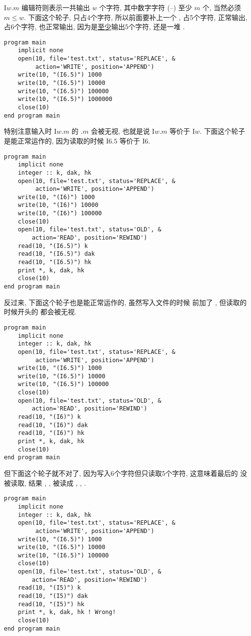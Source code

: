I$ w. m $ 编辑符则表示一共输出 $ w $ 个字符, 其中数字字符 (--) 至少 $ m $ 个, 当然必须 $ m\leqslant  w $. 下面这个轮子,  只占4个字符, 所以前面要补上一个 ,  占5个字符, 正常输出,  占6个字符, 也正常输出, 因为是\uline{至少}输出5个字符,  还是一堆 \ttt{*}. 
\begin{lstlisting}
program main
    implicit none
    open(10, file='test.txt', status='REPLACE', &
         action='WRITE', position='APPEND')
    write(10, "(I6.5)") 1000
    write(10, "(I6.5)") 10000
    write(10, "(I6.5)") 100000
    write(10, "(I6.5)") 1000000
    close(10)
end program main
\end{lstlisting}
特别注意输入时 I$w.m $ 的 $. m $ 会被无视, 也就是说 I$w. m $ 等价于 I$w $. 下面这个轮子是能正常运作的, 因为读取的时候 I$ 6.5 $ 等价于 I$6 $. 
\begin{lstlisting}
program main
    implicit none
    integer :: k, dak, hk
    open(10, file='test.txt', status='REPLACE', &
         action='WRITE', position='APPEND')
    write(10, "(I6)") 1000
    write(10, "(I6)") 10000
    write(10, "(I6)") 100000
    close(10)
    open(10, file='test.txt', status='OLD', &
        action='READ', position='REWIND')
    read(10, "(I6.5)") k
    read(10, "(I6.5)") dak
    read(10, "(I6.5)") hk
    print *, k, dak, hk
    close(10)
end program main
\end{lstlisting}
反过来, 下面这个轮子也是能正常运作的, 虽然写入文件的时候  前加了 , 但读取的时候开头的  都会被无视. 
\begin{lstlisting}
program main
    implicit none
    integer :: k, dak, hk
    open(10, file='test.txt', status='REPLACE', &
         action='WRITE', position='APPEND')
    write(10, "(I6.5)") 1000
    write(10, "(I6.5)") 10000
    write(10, "(I6.5)") 100000
    close(10)
    open(10, file='test.txt', status='OLD', &
        action='READ', position='REWIND')
    read(10, "(I6)") k
    read(10, "(I6)") dak
    read(10, "(I6)") hk
    print *, k, dak, hk
    close(10)
end program main
\end{lstlisting}
但下面这个轮子就不对了, 因为写入6个字符但只读取5个字符, 这意味着最后的  没被读取, 结果 , ,  被读成 , , . 
\begin{lstlisting}
program main
    implicit none
    integer :: k, dak, hk
    open(10, file='test.txt', status='REPLACE', &
         action='WRITE', position='APPEND')
    write(10, "(I6.5)") 1000
    write(10, "(I6.5)") 10000
    write(10, "(I6.5)") 100000
    close(10)
    open(10, file='test.txt', status='OLD', &
        action='READ', position='REWIND')
    read(10, "(I5)") k
    read(10, "(I5)") dak
    read(10, "(I5)") hk
    print *, k, dak, hk ! Wrong!
    close(10)
end program main
\end{lstlisting}

